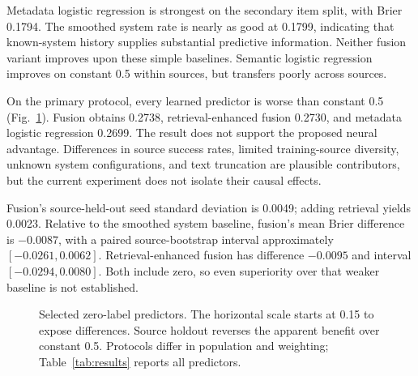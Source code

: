 \documentclass[conference]{IEEEtran}
\begin{document}
Metadata logistic regression is strongest on the secondary item split, with Brier 0.1794. The smoothed system rate is nearly as good at 0.1799, indicating that known-system history supplies substantial predictive information. Neither fusion variant improves upon these simple baselines. Semantic logistic regression improves on constant 0.5 within sources, but transfers poorly across sources.

On the primary protocol, every learned predictor is worse than constant 0.5 (Fig.~\ref{fig:comparison}). Fusion obtains 0.2738, retrieval-enhanced fusion 0.2730, and metadata logistic regression 0.2699. The result does not support the proposed neural advantage. Differences in source success rates, limited training-source diversity, unknown system configurations, and text truncation are plausible contributors, but the current experiment does not isolate their causal effects.

Fusion's source-held-out seed standard deviation is 0.0049; adding retrieval yields 0.0023. Relative to the smoothed system baseline, fusion's mean Brier difference is $-0.0087$, with a paired source-bootstrap interval approximately $[-0.0261,0.0062]$. Retrieval-enhanced fusion has difference $-0.0095$ and interval $[-0.0294,0.0080]$. Both include zero, so even superiority over that weaker baseline is not established.

\begin{figure}[t]
\centering
{}
\caption{Selected zero-label predictors. The horizontal scale starts at 0.15 to expose differences. Source holdout reverses the apparent benefit over constant 0.5. Protocols differ in population and weighting; Table~\ref{tab:results} reports all predictors.}
\label{fig:comparison}
\end{figure}
\end{document}
